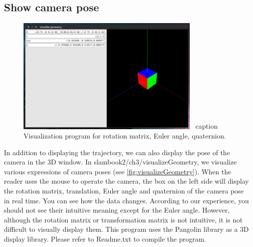 \subsection {Show camera pose}
\begin{figure}[!htp]
    \centering
    \includegraphics[width=0.8\textwidth]{chapter03/rigidMotion/visualizeGeometry.pdf}
    \ caption { Visualization program for rotation matrix, Euler angle, quaternion. }
    \label{fig:visualizeGeometry}
\end{figure}

In addition to displaying the trajectory, we can also display the pose of the camera in the 3D window. In slambook2/ch3/visualizeGeometry, we visualize various expressions of camera poses (see \autoref{fig:visualizeGeometry}). When the reader uses the mouse to operate the camera, the box on the left side will display the rotation matrix, translation, Euler angle and quaternion of the camera pose in real time. You can see how the data changes. According to our experience, you should not see their intuitive meaning except for the Euler angle. However, although the rotation matrix or transformation matrix is not intuitive, it is not difficult to visually display them. This program uses the Pangolin library as a 3D display library. Please refer to Readme.txt to compile the program.
